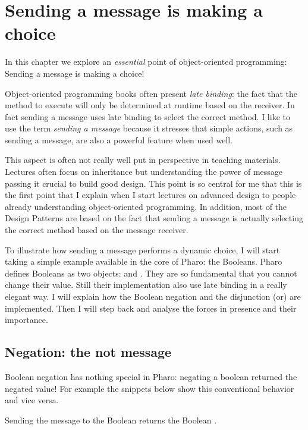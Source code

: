 \documentclass[10pt,twoside,english]{_support/latex/sbabook/sbabook}
\begin{document}
\frontmatter
\pagestyle{plain}

\tableofcontents*
\clearpage\listoffigures

\mainmatter

\chapter{Sending a message is making a choice}\label{cha:messages}
In this chapter we explore an \textit{essential} point of object-oriented programming: Sending a message is making a choice! 

Object-oriented programming books often present \textit{late binding}: the fact that the method to execute will only be determined at runtime based on the receiver. In fact sending a message uses late binding to select the correct method. I like to use the term \textit{sending a message} because it stresses that simple
actions, such as sending a message, are also a powerful feature when used well. 

This aspect is often not really well put in perspective in teaching materials. Lectures often focus on inheritance but understanding the power of message passing it crucial to build good design.
This point is so central for me that this is the first point that I explain when I start lectures on advanced design to people already understanding object-oriented programming. In addition, most of
the Design Patterns are based on the fact that sending a message is actually selecting the correct method
based on the message receiver.

To illustrate how sending a message performs a dynamic choice, I will start taking a simple example available in the core of Pharo: the Booleans. Pharo defines Booleans as two objects:  and . They are so fundamental that you cannot change their value. 
Still their implementation also use late binding in a really elegant way. 
 I will explain how the Boolean negation and the disjunction (or) are implemented. Then I will step back and analyse the forces in presence and their importance. 
\section{Negation: the not message}
Boolean negation has nothing special in Pharo: negating a boolean returned the negated value! 
For example the snippets below show this conventional behavior and vice versa.

Sending the message  to the Boolean  returns the Boolean . 
\end{document}
